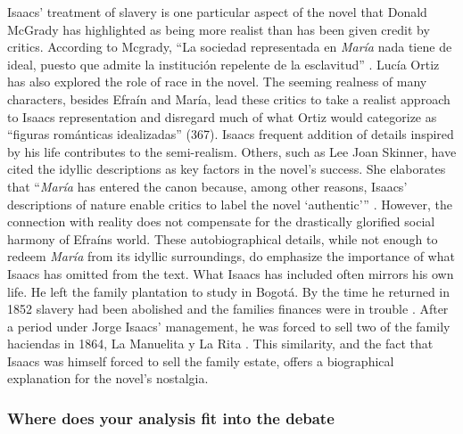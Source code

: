 Isaacs' treatment of slavery is one particular aspect of the novel that Donald McGrady has highlighted as being more realist than has been given credit by critics. 
According to Mcgrady, \enquote{La sociedad representada en \textit{María} nada tiene de ideal, puesto que admite la institución repelente de la esclavitud} \autocite[24]{McGrady2012}.
Lucía Ortiz has also explored the role of race in the novel. 
The seeming realness of many characters, besides Efraín and María, lead these critics to take a realist approach to Isaacs representation and disregard much of what Ortiz would categorize as \enquote{figuras románticas idealizadas} (367)\nocite{Ortiz2007}. 
Isaacs frequent addition of details inspired by his life contributes to the semi-realism. 
Others, such as Lee Joan Skinner, have cited the idyllic descriptions as key factors in the novel's success.
She elaborates that \enquote{\textit{María} has entered the canon because, among other reasons, Isaacs' descriptions of nature enable critics to label the novel \enquote{authentic}} \autocite[13]{Skinner2014}.
However, the connection with reality does not compensate for the drastically glorified social harmony of Efraíns world. 
These autobiographical details, while not enough to redeem \textit{María} from its idyllic surroundings, do emphasize the importance of what Isaacs has omitted from the text.
What Isaacs has included often mirrors his own life. He left the family plantation to study in Bogotá. By the time he returned in 1852 slavery had been abolished and the families finances were in trouble \autocite[145]{Jagoe2003}. 
After a period under Jorge Isaacs' management, he was forced to sell two of the family haciendas in 1864, La Manuelita y La Rita \autocite[261]{Mejia1976}.
This similarity, and the fact that Isaacs was himself forced to sell the family estate, offers a biographical explanation for the novel's nostalgia. 


\subsubsection{Where does your analysis fit into the debate}

